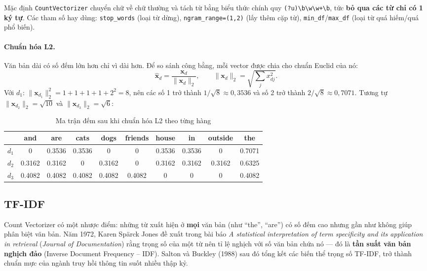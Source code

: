Mặc định \texttt{CountVectorizer} chuyển chữ về chữ thường và tách từ bằng biểu thức chính quy \verb|(?u)\b\w\w+\b|, tức \textbf{bỏ qua các từ chỉ có 1 ký tự}. Các tham số hay dùng: \texttt{stop\_words} (loại từ dừng), \texttt{ngram\_range=(1,2)} (lấy thêm cặp từ), \texttt{min\_df}/\texttt{max\_df} (loại từ quá hiếm/quá phổ biến).

\paragraph{Chuẩn hóa L2.} Văn bản dài có số đếm lớn hơn chỉ vì dài hơn. Để so sánh công bằng, mỗi vector được chia cho chuẩn Euclid của nó:
\begin{equation}
    \hat{\mathbf{x}}_d = \frac{\mathbf{x}_d}{\|\mathbf{x}_d\|_2}, \qquad \|\mathbf{x}_d\|_2 = \sqrt{\textstyle\sum_{j} x_{dj}^2}.
\end{equation}
Với $d_1$: $\|\mathbf{x}_{d_1}\|_2^2 = 1+1+1+1+2^2 = 8$, nên các số 1 trở thành $1/\sqrt{8} \approx 0{,}3536$ và số 2 trở thành $2/\sqrt{8} \approx 0{,}7071$. Tương tự $\|\mathbf{x}_{d_2}\|_2 = \sqrt{10}$ và $\|\mathbf{x}_{d_3}\|_2 = \sqrt{6}$:

\begin{table}[H]
\centering
\small
\begin{tabular}{|l|c|c|c|c|c|c|c|c|c|}
\hline
 & and & are & cats & dogs & friends & house & in & outside & the \\
\hline
$d_1$ & 0 & 0.3536 & 0.3536 & 0 & 0 & 0.3536 & 0.3536 & 0 & 0.7071 \\ \hline
$d_2$ & 0.3162 & 0.3162 & 0 & 0.3162 & 0 & 0.3162 & 0.3162 & 0.3162 & 0.6325 \\ \hline
$d_3$ & 0.4082 & 0.4082 & 0.4082 & 0.4082 & 0.4082 & 0 & 0 & 0 & 0.4082 \\ \hline
\end{tabular}
\caption{Ma trận đếm sau khi chuẩn hóa L2 theo từng hàng}
\label{tab:count-l2}
\end{table}

\subsection{TF-IDF}
\label{sec:tfidf}

Count Vectorizer có một nhược điểm: những từ xuất hiện ở \textbf{mọi} văn bản (như ``the'', ``are'') có số đếm cao nhưng gần như không giúp phân biệt văn bản. Năm 1972, Karen Spärck Jones đề xuất trong bài báo \textit{A statistical interpretation of term specificity and its application in retrieval} (\textit{Journal of Documentation}) rằng trọng số của một từ nên tỉ lệ nghịch với số văn bản chứa nó --- đó là \textbf{tần suất văn bản nghịch đảo} (Inverse Document Frequency -- IDF). Salton và Buckley (1988) sau đó tổng kết các biến thể trọng số TF-IDF, trở thành chuẩn mực của ngành truy hồi thông tin suốt nhiều thập kỷ.

